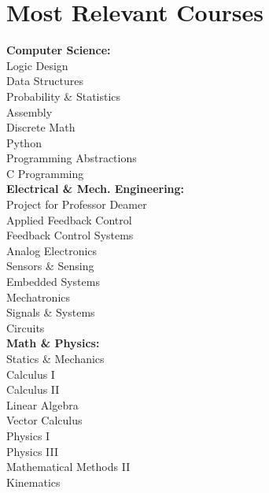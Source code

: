 \documentclass[a4paper,9pt]{article}
\begin{document}
\section*{Most Relevant Courses}
\small
\begin{multicols}{3}
    \textbf{Computer Science:} \\
    Logic Design \\
    Data Structures \\
    Probability \& Statistics \\
    Assembly \\
    Discrete Math \\
    Python \\
    Programming Abstractions \\
    C Programming \\

    \columnbreak
    \textbf{Electrical \& Mech. Engineering:} \\
    Project for Professor Deamer \\
    Applied Feedback Control \\
    Feedback Control Systems \\
    Analog Electronics \\
    Sensors \& Sensing \\
    Embedded Systems \\
    Mechatronics \\
    Signals \& Systems \\
    Circuits \\

    \columnbreak
    \textbf{Math \& Physics:} \\
    Statics \& Mechanics \\
    Calculus I \\
    Calculus II \\
    Linear Algebra \\
    Vector Calculus \\
    Physics I \\
    Physics III \\
    Mathematical Methods II \\
    Kinematics \\

\end{multicols}
\normalsize
\end{document}
